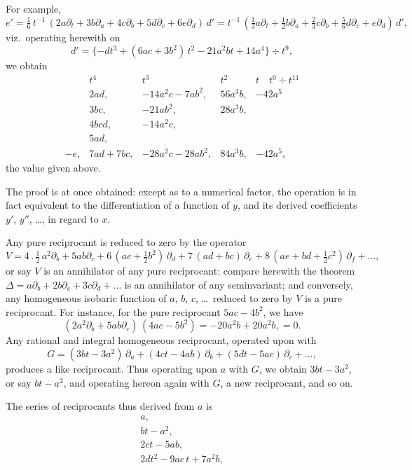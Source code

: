 \documentclass[11pt]{article}
\begin{document}
For example,
\[
e' = \tfrac{1}{6}\,t^{-1}\,(2 a\partial_t + 3 b\partial_a + 4 c\partial_b + 5 d\partial_c + 6 e\partial_d)\,d'
= t^{-1}\,(\tfrac{1}{3} a\partial_t + \tfrac{1}{2} b\partial_a + \tfrac{2}{3} c\partial_b + \tfrac{5}{6} d\partial_c + e\partial_d)\,d',
\]
viz.\ operating herewith on
\[
d' = \{-d t^3 + (6 a c + 3 b^2)\,t^2 - 21 a^2 b t + 14 a^4\} \div t^9,
\]
we obtain
\[
\begin{array}{lcccc}
 & t^4 & t^3 & t^2 & t \quad t^0 \div t^{11} \\
 & 2 a d, & -14 a^2 c - 7 a b^2, & 56 a^3 b, & -42 a^5 \\
 & 3 b c, & -21 a b^2, & 28 a^3 b, & \\
 & 4 b c d, & -14 a^2 c, & & \\
 & 5 a d, & & & \\
-e, & 7 a d + 7 b c, & -28 a^2 c - 28 a b^2, & 84 a^3 b, & -42 a^5,
\end{array}
\]
the value given above.

The proof is at once obtained: except as to a numerical factor, the operation is in fact equivalent to the differentiation of a function of $y$, and its derived coefficients $y'$, $y''$, \ldots, in regard to $x$.

Any pure reciprocant is reduced to zero by the operator
\[
V = 4\,.\,\tfrac{1}{2}\,a^2\partial_b + 5 a b\partial_c + 6\,(a c + \tfrac{1}{2} b^2)\,\partial_d + 7\,(a d + b c)\,\partial_e + 8\,(a e + b d + \tfrac{1}{2} c^2)\,\partial_f + \ldots,
\]
or say $V$ is an annihilator of any pure reciprocant: compare herewith the theorem $\Delta = a\partial_b + 2 b\partial_c + 3 c\partial_d + \ldots$ is an annihilator of any seminvariant; and conversely, any homogeneous isobaric function of $a$, $b$, $c$, \ldots\ reduced to zero by $V$ is a pure reciprocant. For instance, for the pure reciprocant $5 a c - 4 b^2$, we have
\[
(2 a^2\partial_b + 5 a b\partial_c)\,(4 a c - 5 b^2) = -20 a^2 b + 20 a^2 b, = 0.
\]
Any rational and integral homogeneous reciprocant, operated upon with
\[
G = (3 b t - 3 a^2)\,\partial_a + (4 c t - 4 a b)\,\partial_b + (5 d t - 5 a c)\,\partial_c + \ldots,
\]
produces a like reciprocant. Thus operating upon $a$ with $G$, we obtain $3 b t - 3 a^2$, or say $b t - a^2$, and operating hereon again with $G$, a new reciprocant, and so on.

The series of reciprocants thus derived from $a$ is
\[
\begin{array}{l}
a, \\
b t - a^2, \\
2 c t - 5 a b, \\
2 d t^2 - 9 a c\, t + 7 a^2 b, \\
\end{array}
\]
\end{document}
